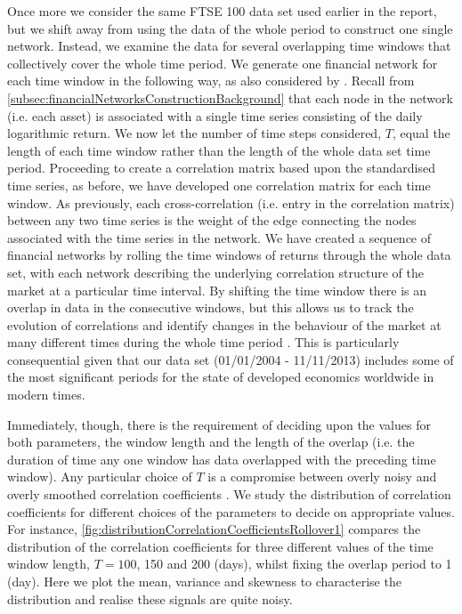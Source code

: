 Once more we consider the same FTSE 100 data set used earlier in the report, but we shift away from using the data of the whole period to construct one single network.
Instead, we examine the data for several overlapping time windows that collectively cover the whole time period.
We generate one financial network for each time window in the following way, as also considered by \cite{OCK+02,OKK03,BD10,FPM+10,FPW+11}.
Recall from \cref{subsec:financialNetworksConstructionBackground} that each node in the network (i.e. each asset) is associated with a single time series consisting of the daily logarithmic return.
We now let the number of time steps considered, $T$, equal the length of each time window rather than the length of the whole data set time period.
Proceeding to create a correlation matrix based upon the standardised time series, as before, we have developed one correlation matrix for each time window.
As previously, each cross-correlation (i.e. entry in the correlation matrix) between any two time series is the weight of the edge connecting the nodes associated with the time series in the network.
We have created a sequence of financial networks by rolling the time windows of returns through the whole data set, with each network describing the underlying correlation structure of the market at a particular time interval.
By shifting the time window there is an overlap in data in the consecutive windows, but this allows us to track the evolution of correlations and identify changes in the behaviour of the market at many different times during the whole time period \cite{FPW+11}.
This is particularly consequential given that our data set (01/01/2004 - 11/11/2013) includes some of the most significant periods for the state of developed economics worldwide in modern times.

Immediately, though, there is the requirement of deciding upon the values for both parameters, the window length and the length of the overlap (i.e. the duration of time any one window has data overlapped with the preceding time window).
Any particular choice of $T$ is a compromise between overly noisy and overly smoothed correlation coefficients \cite{OCK+02,FPW+11}.
We study the distribution of correlation coefficients for different choices of the parameters to decide on appropriate values.
For instance, \cref{fig:distributionCorrelationCoefficientsRollover1} compares the distribution of the correlation coefficients for three different values of the time window length, $T=100$, 150 and 200 (days), whilst fixing the overlap period to 1 (day).
Here we plot the mean, variance and skewness to characterise the distribution and realise these signals are quite noisy.

